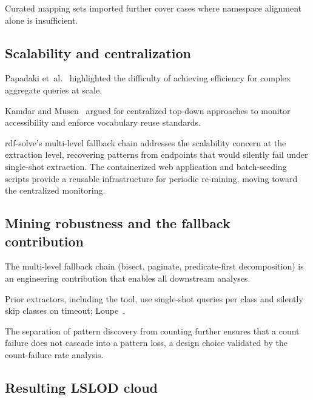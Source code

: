 \documentclass[12pt]{article}
\begin{document}
Curated mapping sets imported further cover cases where namespace alignment alone is insufficient. %

\subsection{Scalability and centralization}

Papadaki et~al.~\cite{papadaki} highlighted the difficulty of
achieving efficiency for complex aggregate queries at scale.

Kamdar and Musen~\cite{kamdar_empirical_2021} argued for centralized
top-down approaches to monitor accessibility and enforce vocabulary
reuse standards.

rdf-solve's multi-level fallback chain addresses the scalability
concern at the extraction level, recovering patterns from endpoints
that would silently fail under single-shot extraction.
The containerized web application and batch-seeding scripts provide a
reusable infrastructure for periodic re-mining, moving toward the
centralized monitoring. %



\subsection{Mining robustness and the fallback contribution}

The multi-level fallback chain (bisect, paginate, predicate-first
decomposition) is an engineering contribution that enables all
downstream analyses. %

Prior extractors, including the \cite{kamdar_empirical_2021} tool, use
single-shot queries per class and silently skip classes on timeout; Loupe~\cite{loupe2015}.  %

The separation of pattern discovery from counting further ensures
that a count failure does not cascade into a pattern loss, a design
choice validated by the count-failure rate analysis.

\subsection{Resulting LSLOD cloud}
\end{document}
